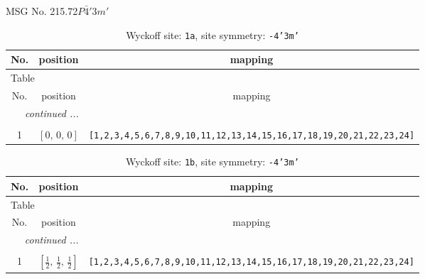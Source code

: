 \documentclass[fleqn,8pt]{jsarticle}
\begin{document}
\setcounter{MaxMatrixCols}{32}

\renewcommand{\tablename}{Table~}
\renewcommand{\figurename}{Figure~}
\begin{center}
\LARGE
MSG No. 215.72\quad$P\bar{4}'3m'$
\end{center}
\renewcommand{\arraystretch}{1.2}
\begin{longtable}{ccc}
\caption{Wyckoff site: {\tt 1a}, site symmetry: {\tt -4'3m'}}
 \\
 \hline \hline
No. & position & mapping \\ \hline \endfirsthead

\multicolumn{2}{l}{\tablename\ \thetable{}} \\
 \hline \hline
No. & position & mapping \\ \hline \endhead

 \hline \hline
\multicolumn{2}{r}{\footnotesize\it continued ...} \\ \endfoot

 \hline \hline
\multicolumn{2}{r}{} \\ \endlastfoot

1 & $\left[ 0,\, 0,\, 0 \right]$ & {\tt [1,2,3,4,5,6,7,8,9,10,11,12,13,14,15,16,17,18,19,20,21,22,23,24]} \\
\end{longtable}
\renewcommand{\arraystretch}{1.2}
\begin{longtable}{ccc}
\caption{Wyckoff site: {\tt 1b}, site symmetry: {\tt -4'3m'}}
 \\
 \hline \hline
No. & position & mapping \\ \hline \endfirsthead

\multicolumn{2}{l}{\tablename\ \thetable{}} \\
 \hline \hline
No. & position & mapping \\ \hline \endhead

 \hline \hline
\multicolumn{2}{r}{\footnotesize\it continued ...} \\ \endfoot

 \hline \hline
\multicolumn{2}{r}{} \\ \endlastfoot

1 & $\left[ \frac{1}{2},\, \frac{1}{2},\, \frac{1}{2} \right]$ & {\tt [1,2,3,4,5,6,7,8,9,10,11,12,13,14,15,16,17,18,19,20,21,22,23,24]} \\
\end{longtable}
\renewcommand{\arraystretch}{1.2}
\end{document}
